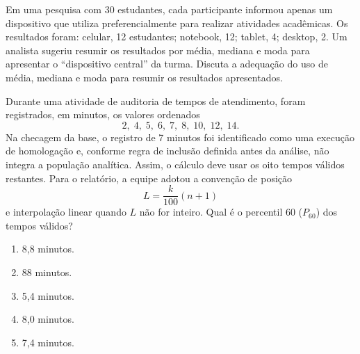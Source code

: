 \documentclass[12pt,a4paper]{article}
\begin{document}
\TextoBase
Em uma pesquisa com 30 estudantes, cada participante informou apenas um dispositivo que utiliza preferencialmente para realizar atividades acadêmicas. Os resultados foram: celular, 12 estudantes; notebook, 12; tablet, 4; desktop, 2. Um analista sugeriu resumir os resultados por média, mediana e moda para apresentar o ``dispositivo central'' da turma.
\FonteDidatica
\Comando Discuta a adequação do uso de média, mediana e moda para resumir os resultados apresentados.
\EspacoDiscursiva

\TextoBase
Durante uma atividade de auditoria de tempos de atendimento, foram registrados, em minutos, os valores ordenados
\[
2,\;4,\;5,\;6,\;7,\;8,\;10,\;12,\;14.
\]
Na checagem da base, o registro de 7 minutos foi identificado como uma execução de homologação e, conforme regra de inclusão definida antes da análise, não integra a população analítica. Assim, o cálculo deve usar os oito tempos válidos restantes. Para o relatório, a equipe adotou a convenção de posição
\[
L=\frac{k}{100}(n+1)
\]
e interpolação linear quando $L$ não for inteiro.
\FonteDidatica
\Comando Qual é o percentil 60 ($P_{60}$) dos tempos válidos?
\begin{enumerate}[label=\Alph*)]
\item 8,8 minutos.
\item 88 minutos.
\item 5,4 minutos.
\item 8,0 minutos.
\item 7,4 minutos.
\end{enumerate}
\end{document}
